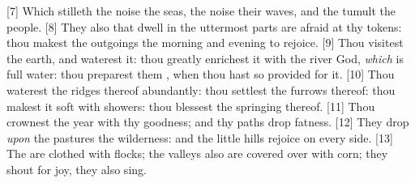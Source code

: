 [7] \textcolor[cmyk]{0.99998,1,0,0}{Which stilleth the noise  the seas, the noise  their waves, and the tumult  the people.}
[8] \textcolor[cmyk]{0.99998,1,0,0}{They also that dwell in the uttermost parts are afraid at thy tokens: thou makest the outgoings  the morning and evening to rejoice.}
[9] \textcolor[cmyk]{0.99998,1,0,0}{Thou visitest the earth, and waterest it: thou greatly enrichest it with the river  God, \emph{which} is full  water: thou preparest them , when thou hast so provided for it.}
[10] \textcolor[cmyk]{0.99998,1,0,0}{Thou waterest the ridges thereof abundantly: thou settlest the furrows thereof: thou makest it soft with showers: thou blessest the springing thereof.}
[11] \textcolor[cmyk]{0.99998,1,0,0}{Thou crownest the year with thy goodness; and thy paths drop fatness.}
[12] \textcolor[cmyk]{0.99998,1,0,0}{They drop \emph{upon} the pastures  the wilderness: and the little hills rejoice on every side.}
[13] \textcolor[cmyk]{0.99998,1,0,0}{The  are clothed with flocks; the valleys also are covered over with corn; they shout for joy, they also sing.}



